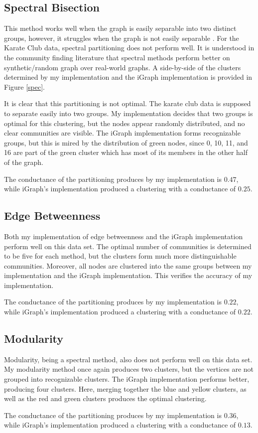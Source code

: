 \documentclass{article}
\begin{document}
    \subsection{Spectral Bisection}
    This method works well when the graph is easily separable into two distinct groups, however, it struggles when the graph is not easily separable \cite{Newman2004}. For the Karate Club data, spectral partitioning does not perform well. It is understood in the community finding literature that spectral methods perform better on synthetic/random graph over real-world graphs. A side-by-side of the clusters determined by my implementation and the iGraph implementation is provided in Figure \ref{spec}.
    \par
    It is clear that this partitioning is not optimal. The karate club data is supposed to separate easily into two groups. My implementation decides that two groups is optimal for this clustering, but the nodes appear randomly distributed, and no clear communities are visible. The iGraph implementation forms recognizable groups, but this is mired by the distribution of green nodes, since 0, 10, 11, and 16 are part of the green cluster which has most of its members in the other half of the graph.
    \par
    The conductance of the partitioning produces by my implementation is $0.47$, while iGraph's implementation produced a clustering with a conductance of $0.25$.

    \subsection{Edge Betweenness}
    Both my implementation of edge betweenness and the iGraph implementation perform well on this data set. The optimal number of communities is determined to be five for each method, but the clusters form much more distinguishable communities. Moreover, all nodes are clustered into the same groups between my implementation and the iGraph implementation. This verifies the accuracy of my implementation.
    \par
    The conductance of the partitioning produces by my implementation is $0.22$, while iGraph's implementation produced a clustering with a conductance of $0.22$.

    \subsection{Modularity}
    Modularity, being a spectral method, also does not perform well on this data set. My modularity method once again produces two clusters, but the vertices are not grouped into recognizable clusters. The iGraph implementation performs better, producing four clusters. Here, merging together the blue and yellow clusters, as well as the red and green clusters produces the optimal clustering.
    \par
    The conductance of the partitioning produces by my implementation is $0.36$, while iGraph's implementation produced a clustering with a conductance of $0.13$.
\end{document}
